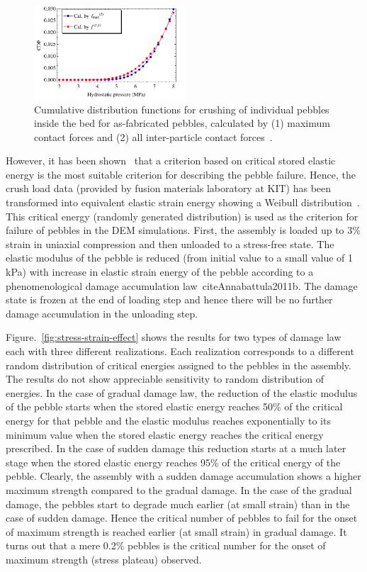 \begin{figure}[!h]
  \begin{center}
\includegraphics[width=0.5\textwidth]{chapters/figures/Fig-4}
\end{center}
 \caption{Cumulative distribution functions for crushing of individual pebbles inside the bed for as-fabricated pebbles, calculated by (1) maximum contact forces and (2) all inter-particle contact forces~\cite{Gan:2010kc}.}
 \label{fig:cdf_pebbles}
\end{figure}

However, it has been shown~\cite{Zhao2010,Zhao2011} that a criterion based on critical stored elastic energy is the most suitable criterion for describing the \lis pebble failure. Hence, the crush load data (provided by fusion materials laboratory at KIT) has been transformed into equivalent elastic strain energy showing a Weibull distribution~\cite{Zhao2010}. This critical energy (randomly generated distribution) is used as the criterion for failure of pebbles in the DEM simulations. First, the assembly is loaded up to 3\% strain in uniaxial compression and then unloaded to a stress-free state. The elastic modulus of the pebble is reduced (from initial value to a small value of 1 kPa) with increase in elastic strain energy of the pebble according to a phenomenological damage accumulation law~cite{Annabattula2011b}. The damage state is frozen at the end of loading step and hence there will be no further damage accumulation in the unloading step. 

Figure.~\ref{fig:stress-strain-effect} shows the results for two types of damage law each with three different realizations. Each realization corresponds to a different random distribution of critical energies assigned to the pebbles in the assembly. The results do not show appreciable sensitivity to random distribution of energies. In the case of gradual damage law, the reduction of the elastic modulus of the pebble starts when the stored elastic energy reaches 50\% of the critical energy for that pebble and the elastic modulus reaches exponentially to its minimum value when the stored elastic energy reaches the critical energy prescribed. In the case of sudden damage this reduction starts at a much later stage when the stored elastic energy reaches 95\% of the critical energy of the pebble. Clearly, the assembly with a sudden damage accumulation shows a higher maximum strength compared to the gradual damage. In the case of the gradual damage, the pebbles start to degrade much earlier (at small strain) than in the case of sudden damage. Hence the critical number of pebbles to fail for the onset of maximum strength is reached earlier (at small strain) in gradual damage. It turns out that a mere 0.2\% pebbles is the critical number for the onset of maximum strength (stress plateau) observed.

